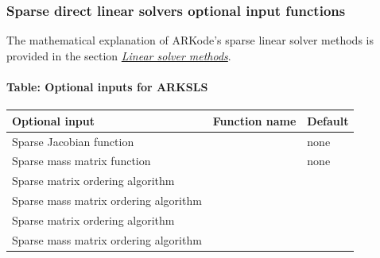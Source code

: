 \documentclass[letterpaper,10pt,english]{sphinxmanual}
\begin{document}
\subsubsection{Sparse direct linear solvers optional input functions}
\label{c_interface/User_callable:sparse-direct-linear-solvers-optional-input-functions}\label{c_interface/User_callable:cinterface-arkslsinputs}
The mathematical explanation of ARKode's sparse linear solver methods
is provided in the section {\hyperref[Mathematics:mathematics-linear]{\emph{Linear solver methods}}}.


\paragraph{Table: Optional inputs for ARKSLS}
\label{c_interface/User_callable:table-optional-inputs-for-arksls}
\begin{tabulary}{\linewidth}{|L|L|L|}
\hline
\textbf{
Optional input
} & \textbf{
Function name
} & \textbf{
Default
}\\\hline

Sparse Jacobian function
 & 
{\hyperref[c_interface/User_callable:ARKSlsSetSparseJacFn]{}}
 & 
none
\\\hline

Sparse mass matrix function
 & 
{\hyperref[c_interface/User_callable:ARKSlsSetSparseMassFn]{}}
 & 
none
\\\hline

Sparse matrix ordering algorithm
 & 
{\hyperref[c_interface/User_callable:ARKKLUSetOrdering]{}}
 & 
\\\hline

Sparse mass matrix ordering algorithm
 & 
{\hyperref[c_interface/User_callable:ARKMassKLUSetOrdering]{}}
 & 
\\\hline

Sparse matrix ordering algorithm
 & 
{\hyperref[c_interface/User_callable:ARKSuperLUMTSetOrdering]{}}
 & 
\\\hline

Sparse mass matrix ordering algorithm
 & 
{\hyperref[c_interface/User_callable:ARKMassSuperLUMTSetOrdering]{}}
 & 
\\\hline
\end{tabulary}
\end{document}
